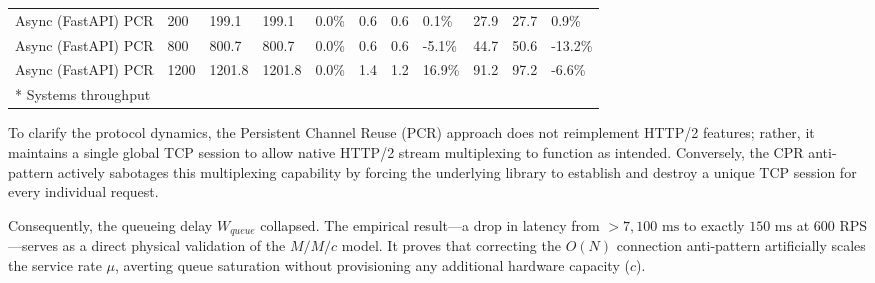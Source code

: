 \documentclass{ieeeaccess}
\begin{document}
\begin{table}[htbp]
\begin{tabular}{lllllllllll}
			Async (FastAPI) PCR & 200  & 199.1  & 199.1  & 0.0\%  & 0.6   & 0.6  & 0.1\%  & 27.9  & 27.7 & 0.9\% \\
			Async (FastAPI) PCR & 800  & 800.7  & 800.7  & 0.0\%  & 0.6   & 0.6  & -5.1\% & 44.7  & 50.6 & -13.2\% \\
			Async (FastAPI) PCR & 1200 & 1201.8 & 1201.8 & 0.0\%  & 1.4   & 1.2  & 16.9\% & 91.2  & 97.2 & -6.6\% \\
			\hline
			\vspace{5pt}
			* Systems throughput
	\end{tabular}
\end{table}


To clarify the protocol dynamics, the Persistent Channel Reuse (PCR) approach does not reimplement HTTP/2 features; rather, it maintains a single global TCP session to allow native HTTP/2 stream multiplexing to function as intended. Conversely, the CPR anti-pattern actively sabotages this multiplexing capability by forcing the underlying library to establish and destroy a unique TCP session for every individual request.

Consequently, the queueing delay $W_{queue}$ collapsed. The empirical result—a drop in latency from $> 7,100 \text{ ms}$ to exactly $150 \text{ ms}$ at 600 RPS—serves as a direct physical validation of the $M/M/c$ model. It proves that correcting the $O(N)$ connection anti-pattern artificially scales the service rate $\mu$, averting queue saturation without provisioning any additional hardware capacity ($c$).

\end{document}
